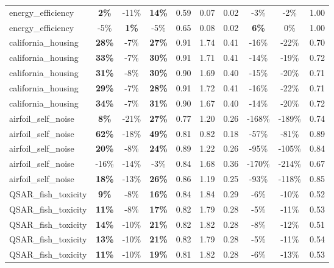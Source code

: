 \begin{table}[!htbp]
\begin{small}
\begin{sc}
{\begin{tabular}{lccccccccc}
energy\_efficiency & \textbf{2\%} & -11\% & \textbf{14\%} & 0.59 & 0.07 & 0.02 & -3\% & -2\% & 1.00 \\
energy\_efficiency & -5\% & \textbf{1\%} & -5\% & 0.65 & 0.08 & 0.02 & \textbf{6\%} & 0\% & 1.00 \\
california\_housing & \textbf{28\%} & -7\% & \textbf{27\%} & 0.91 & 1.74 & 0.41 & -16\% & -22\% & 0.70 \\
california\_housing & \textbf{33\%} & -7\% & \textbf{30\%} & 0.91 & 1.71 & 0.41 & -14\% & -19\% & 0.72 \\
california\_housing & \textbf{31\%} & -8\% & \textbf{30\%} & 0.90 & 1.69 & 0.40 & -15\% & -20\% & 0.71 \\
california\_housing & \textbf{29\%} & -7\% & \textbf{28\%} & 0.91 & 1.72 & 0.41 & -16\% & -22\% & 0.71 \\
california\_housing & \textbf{34\%} & -7\% & \textbf{31\%} & 0.90 & 1.67 & 0.40 & -14\% & -20\% & 0.72 \\
airfoil\_self\_noise & \textbf{8\%} & -21\% & \textbf{27\%} & 0.77 & 1.20 & 0.26 & -168\% & -189\% & 0.74 \\
airfoil\_self\_noise & \textbf{62\%} & -18\% & \textbf{49\%} & 0.81 & 0.82 & 0.18 & -57\% & -81\% & 0.89 \\
airfoil\_self\_noise & \textbf{20\%} & -8\% & \textbf{24\%} & 0.89 & 1.22 & 0.26 & -95\% & -105\% & 0.84 \\
airfoil\_self\_noise & -16\% & -14\% & -3\% & 0.84 & 1.68 & 0.36 & -170\% & -214\% & 0.67 \\
airfoil\_self\_noise & \textbf{18\%} & -13\% & \textbf{26\%} & 0.86 & 1.19 & 0.25 & -93\% & -118\% & 0.85 \\
QSAR\_fish\_toxicity & \textbf{9\%} & -8\% & \textbf{16\%} & 0.84 & 1.84 & 0.29 & -6\% & -10\% & 0.52 \\
QSAR\_fish\_toxicity & \textbf{11\%} & -8\% & \textbf{17\%} & 0.82 & 1.79 & 0.28 & -5\% & -11\% & 0.53 \\
QSAR\_fish\_toxicity & \textbf{14\%} & -10\% & \textbf{21\%} & 0.82 & 1.82 & 0.28 & -8\% & -12\% & 0.51 \\
QSAR\_fish\_toxicity & \textbf{13\%} & -10\% & \textbf{21\%} & 0.82 & 1.79 & 0.28 & -5\% & -11\% & 0.54 \\
QSAR\_fish\_toxicity & \textbf{11\%} & -10\% & \textbf{19\%} & 0.81 & 1.82 & 0.28 & -6\% & -13\% & 0.53 \\
\bottomrule
\end{tabular}
}
\end{sc}
\end{small}
\end{table}

